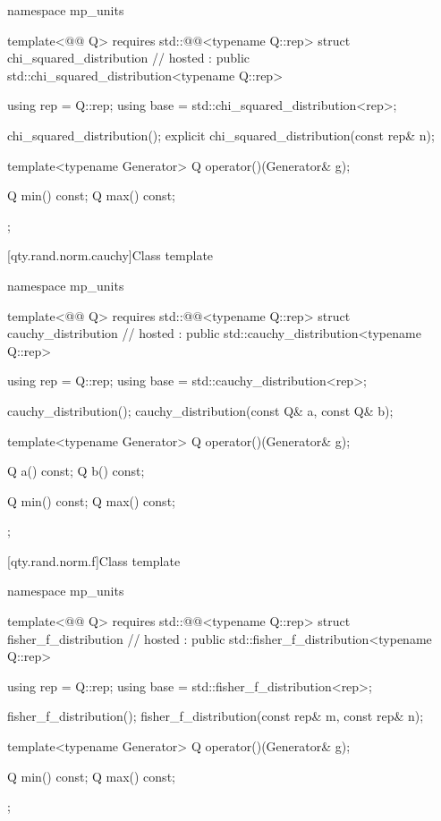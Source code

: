 \begin{codeblock}
namespace mp_units {
template<@@ Q>
  requires std::@@<typename Q::rep>
struct chi_squared_distribution                                                         // hosted
    : public std::chi_squared_distribution<typename Q::rep> {
  using rep = Q::rep;
  using base = std::chi_squared_distribution<rep>;

  chi_squared_distribution();
  explicit chi_squared_distribution(const rep& n);

  template<typename Generator>
  Q operator()(Generator& g);

  Q min() const;
  Q max() const;
};
}
\end{codeblock}

[qty.rand.norm.cauchy]{Class template }

\begin{codeblock}
namespace mp_units {
template<@@ Q>
  requires std::@@<typename Q::rep>
struct cauchy_distribution                                                              // hosted
    : public std::cauchy_distribution<typename Q::rep> {
  using rep = Q::rep;
  using base = std::cauchy_distribution<rep>;

  cauchy_distribution();
  cauchy_distribution(const Q& a, const Q& b);

  template<typename Generator>
  Q operator()(Generator& g);

  Q a() const;
  Q b() const;

  Q min() const;
  Q max() const;
};
}
\end{codeblock}

[qty.rand.norm.f]{Class template }

\begin{codeblock}
namespace mp_units {
template<@@ Q>
  requires std::@@<typename Q::rep>
struct fisher_f_distribution                                                            // hosted
    : public std::fisher_f_distribution<typename Q::rep> {
  using rep = Q::rep;
  using base = std::fisher_f_distribution<rep>;

  fisher_f_distribution();
  fisher_f_distribution(const rep& m, const rep& n);

  template<typename Generator>
  Q operator()(Generator& g);

  Q min() const;
  Q max() const;
};
}
\end{codeblock}

